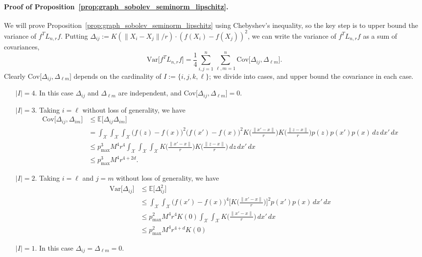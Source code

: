 \documentclass[twoside]{article}
\newcommand{\Var}{\mathrm{Var}}
\newcommand{\Cov}{\mathrm{Cov}}
\newcommand{\1}{\mathbf{1}}
\newcommand{\Lap}{L}
\newcommand{\Xset}{\mathcal{X}}
\newcommand{\Ebb}{\mathbb{E}}
\theoremstyle{definition}
\theoremstyle{remark}
\begin{document}
\paragraph{Proof of Proposition~\ref{prop:graph_sobolev_seminorm_lipschitz}.}
We will prove Proposition~\ref{prop:graph_sobolev_seminorm_lipschitz} using Chebyshev's inequality, so the key step is to upper bound the variance of $f^{T}\Lap_{n,r}f$. Putting $\varDelta_{ij} := K(\|X_i - X_j\|/r) \cdot (f(X_i) - f(X_j))^2$, we can write the variance of $f^T \Lap_{n,r} f$ as a sum of covariances,
\begin{equation*}
\Var\bigl[f^T \Lap_{n,r} f\bigr] = \frac{1}{4} \sum_{i, j = 1}^{n} \sum_{\ell,m = 1}^{n} \Cov\bigl[\varDelta_{ij},\varDelta_{\ell m}\bigr].
\end{equation*}
Clearly $\Cov\bigl[\varDelta_{ij},\varDelta_{\ell m}\bigr]$ depends on the cardinality of $I := \{i,j,k,\ell\}$; we divide into cases, and upper bound the covariance in each case.
\begin{enumerate}
	\item[$\bigl|I\bigr| = 4$.] In this case $\varDelta_{ij}$ and $\varDelta_{\ell m}$ are independent, and $\Cov\bigl[\varDelta_{ij},\varDelta_{\ell m}\bigr] = 0$.
	\item[$\bigl|I\bigr| = 3$.] Taking $i = \ell$ without loss of generality, we have
	\begin{align*}
	\Cov\bigl[\varDelta_{ij},\varDelta_{i m}\bigr] & \leq \Ebb\bigl[\varDelta_{ij} \varDelta_{i m} \bigr] \\
	& = \int_{\Xset} \int_{\Xset} \int_{\Xset} \bigl(f(z) - f(x)\bigr)^2 \bigl(f(x') - f(x)\bigr)^2 K\biggl(\frac{\|x' - x\|}{r}\biggr) K\biggl(\frac{\|z - x\|}{r}\biggr) p(z) p(x') p(x) \,dz \,dx' \,dx \\
	& \leq p_{\max}^3 M^4 r^4 \int_{\Xset} \int_{\Xset} \int_{\Xset} K\biggl(\frac{\|x' - x\|}{r}\biggr) K\biggl(\frac{\|z - x\|}{r}\biggr) \,dz \,dx' \,dx \\
	& \leq p_{\max}^3 M^4 r^{4 + 2d}.
	\end{align*}
	\item[$\bigl|I\bigr| = 2$.] Taking $i = \ell$ and $j = m$ without loss of generality, we have
	\begin{align*}
	\Var\bigl[\varDelta_{ij}\bigr] & \leq \Ebb\bigl[\varDelta_{ij}^2\bigr] \\
	& \leq \int_{\Xset} \int_{\Xset} \bigl(f(x') - f(x)\bigr)^4 \biggl[K\biggl(\frac{\|x' - x\|}{r}\biggr)\biggr]^2 p(x') p(x) \,dx' \,dx \\
	& \leq p_{\max}^2 M^4 r^4 K(0) \int_{\Xset} \int_{\Xset} K\biggl(\frac{\|x' - x\|}{r}\biggr) \,dx' \,dx \\
	& \leq p_{\max}^2 M^4 r^{4 + d} K(0)
	\end{align*}
	\item[$\bigl|I\bigr| = 1$.] In this case $\varDelta_{i j} = \varDelta_{\ell m} = 0$.
\end{enumerate}
\end{document}
